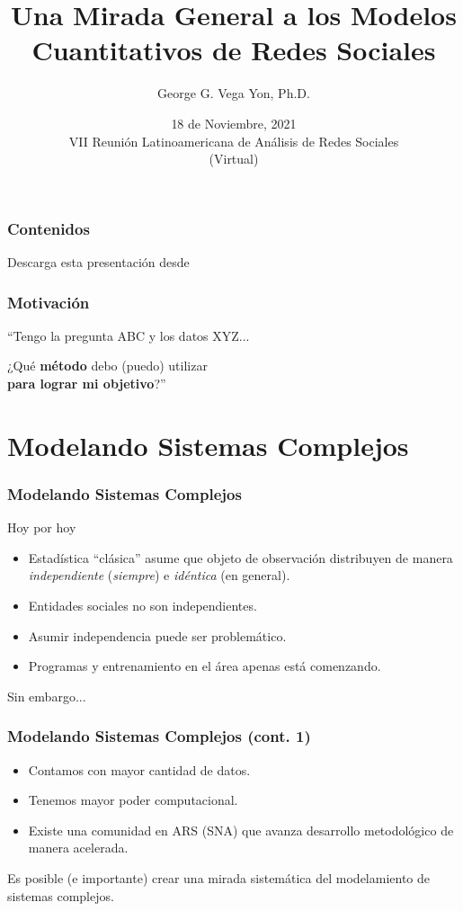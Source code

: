 \documentclass[aspectratio=169]{beamer}
\title[Modelos Cuant. de Redes Sociales]{Una Mirada General a los Modelos Cuantitativos de Redes Sociales}
\author[ggvy.cl]{George G. Vega Yon, Ph.D.}
\date{18 de Noviembre, 2021\\VII Reunión Latinoamericana de Análisis de Redes Sociales\\(Virtual)}
\institute[UofU Epi]{Division of Epidemiology\\University of Utah}
\begin{document}

\begin{frame}
	\frametitle{Contenidos}
\tableofcontents\pause
\vfill\hfill%
Descarga esta presentación desde \href{https://ggv.cl/slides/ars2021}{}
\end{frame}

\begin{frame}
	\frametitle{Motivación}
	``Tengo la pregunta ABC y los datos XYZ...\pause \bigskip
	\hfill\begin{minipage}{.8\linewidth}
		\raggedleft
		\Large ¿Qué \textbf{método} debo (puedo) utilizar\\\textbf{para lograr mi objetivo}?''
	\end{minipage}
\end{frame}

\section{Modelando Sistemas Complejos}


\begin{frame}
	\frametitle{Modelando Sistemas Complejos}
	Hoy por hoy
	\pause
	\begin{itemize}
		\item Estadística ``clásica'' asume que objeto de observación distribuyen de manera \textit{independiente} (\textit{siempre}) e \textit{idéntica}\pause{} (en general).\pause
		\item Entidades sociales no son independientes.\pause
		\item Asumir independencia puede ser problemático.\pause
		\item Programas y entrenamiento en el área apenas está comenzando.
	\end{itemize}\pause
	\vfill\hfill Sin embargo...
	\end{frame}

\begin{frame}
	\frametitle{Modelando Sistemas Complejos (cont. 1)}
	\begin{itemize}
		\item Contamos con mayor cantidad de datos.\pause
		\item Tenemos mayor poder computacional.\pause
		\item Existe una comunidad en ARS (SNA) que avanza desarrollo metodológico de manera acelerada.\pause
\end{itemize}

\vfill\hfill\large Es posible (e importante) crear una mirada sistemática del modelamiento de sistemas complejos.

\end{frame}
\end{document}
